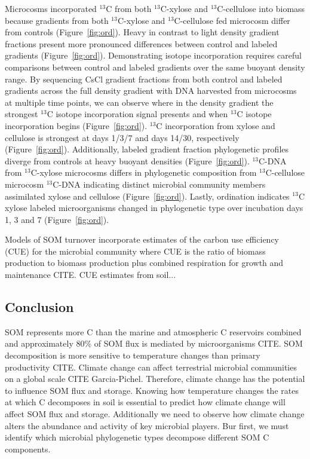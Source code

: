 Microcosms incorporated $^{13}$C from both $^{13}$C-xylose and
$^{13}$C-cellulose into biomass because gradients from both $^{13}$C-xylose and
$^{13}$C-cellulose fed microcosm differ from controls (Figure~\ref{fig:ord}).
Heavy in contrast to light density gradient fractions present more pronounced
differences between control and labeled gradients (Figure~\ref{fig:ord}).
Demonstrating isotope incorporation requires careful comparisons between
control and labeled gradients over the same buoyant density range. By
sequencing CsCl gradient fractions from both control and labeled gradients
across the full density gradient with DNA harvested from microcosms at multiple
time points, we can observe where in the density gradient the strongest
$^{13}$C isotope incorporation signal presents and when $^{13}$C isotope
incorporation begins (Figure~\ref{fig:ord}). $^{13}$C incorporation from xylose
and cellulose is strongest at days 1/3/7 and days 14/30, respectively
(Figure~\ref{fig:ord}). Additionally, labeled gradient fraction phylogenetic
profiles diverge from controls at heavy buoyant densities
(Figure~\ref{fig:ord}). $^{13}$C-DNA from $^{13}$C-xylose microcosms differs in
phylogenetic composition from $^{13}$C-cellulose microcosm $^{13}$C-DNA
indicating distinct microbial community members assimilated xylose and
cellulose (Figure~\ref{fig:ord}). Lastly, ordination indicates $^{13}$C xylose
labeled microorganisms changed in phylogenetic type over incubation days 1, 3
and 7 (Figure~\ref{fig:ord}).

Models of SOM turnover incorporate estimates of the carbon use efficiency
(CUE) for the microbial community where CUE is the ratio of biomass
production to biomass production plus combined respiration for growth and
maintenance CITE.  CUE estimates from soil... 

\subsection{Conclusion} \label{sub:succession_with_degradation_of_labile_c}
SOM represents more C than the marine and atmospheric C reservoirs
combined and approximately 80\% of SOM flux is mediated by microorganisms
CITE. SOM decomposition is more sensitive to temperature changes than
primary productivity CITE. Climate change can affect terrestrial microbial
communities on a global scale CITE Garcia-Pichel. Therefore, climate
change has the potential to influence SOM flux and storage. Knowing how
temperature changes the rates at which C decomposes in soil is essential
to predict how climate change will affect SOM flux and storage.
Additionally we need to observe how climate change alters the abundance
and activity of key microbial players. Bur first, we must identify which
microbial phylogenetic types decompose different SOM C components.

